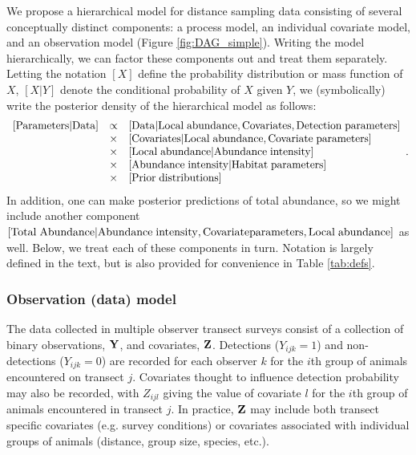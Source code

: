 \documentclass[10pt]{article}
\begin{document}
We propose a hierarchical model for distance sampling data consisting of several conceptually distinct components: a process model, an individual covariate model, and an observation model (Figure \ref{fig:DAG_simple}).  Writing the model hierarchically, we can factor these components out
and treat them separately.  Letting the notation $[X]$ define the probability distribution or mass function of $X$, $[X|Y]$ denote the conditional probability of $X$ given $Y$, we (symbolically) write the posterior density of the hierarchical model as follows:
$$
\begin{array}{lll}
[ {\rm Parameters} | {\rm Data}] & \propto & [{\rm Data | Local \hspace{1mm} abundance, Covariates, Detection \hspace{1mm} parameters}]\\
& \times & [{\rm Covariates|Local \hspace{1mm} abundance, Covariate \hspace{1mm} parameters}]\\
& \times & [{\rm Local \hspace{1mm} abundance | Abundance \hspace{1mm} intensity }]\\
& \times & [{\rm Abundance \hspace{1mm} intensity | Habitat  \hspace{1mm}  parameters}]\\
& \times & [{\rm Prior \hspace{1mm} distributions}]
\end{array}.
$$
In addition, one can make posterior predictions of total abundance, so we might include another component
$[{\rm Total \hspace{1mm} Abundance |Abundance \hspace{1mm} intensity,Covariate parameters,Local \hspace{1mm} abundance }]$ as well.  Below, we treat each of these components in turn.  Notation is largely defined in the text, but is also provided for convenience in Table \ref{tab:defs}.

\subsubsection*{Observation (data) model}

The data collected in multiple observer transect surveys consist of a collection of binary observations, ${\bf Y}$, and covariates, ${\bf Z}$.  Detections ($Y_{ijk}=1$) and non-detections ($Y_{ijk}=0$) are recorded for each observer $k$ for the $i$th group of animals encountered on transect $j$.  Covariates thought to influence detection probability may also be recorded, with $Z_{ijl}$ giving the value of covariate $l$ for the $i$th group of animals encountered in transect $j$.  In practice, ${\bf Z}$ may include both transect specific covariates (e.g. survey conditions) or covariates associated with individual groups of animals (distance, group size, species, etc.).
\end{document}
